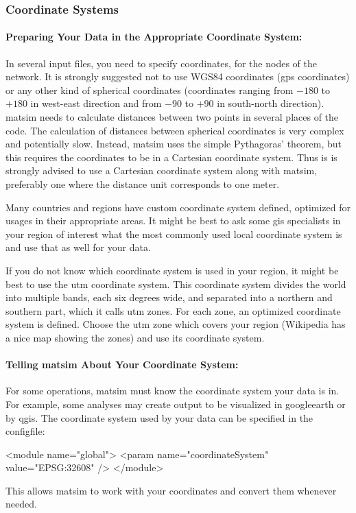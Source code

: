 \subsubsection{Coordinate Systems}
\label{sec:coordinatesystems}
\paragraph{Preparing Your Data in the Appropriate Coordinate System:}
In several input files, you need to specify coordinates, \eg for the nodes of the network. It is strongly suggested not to use WGS84 coordinates (\ie \gls{gps} coordinates) or any other kind of spherical coordinates (coordinates ranging from $-180$ to $+180$ in west-east direction and from $-90$ to $+90$ in south-north direction). \gls{matsim} needs to calculate distances between two points in several places of the code. The calculation of distances between spherical coordinates is very complex and potentially slow. Instead, \gls{matsim} uses the simple Pythagoras' theorem, but this requires the coordinates to be in a Cartesian coordinate system. Thus is is strongly advised to use a Cartesian coordinate system along with \gls{matsim}, preferably one where the distance unit corresponds to one meter.

Many countries and regions have custom coordinate system defined, optimized for usages in their appropriate areas. It might be best to ask some \gls{gis} specialists in your region of interest what the most commonly used local coordinate system is and use that as well for your data.

If you do not
know which coordinate system is used in your region, it might be best to use the \gls{utm} coordinate system. This coordinate system divides the world into multiple bands, each six degrees wide, and separated into a northern and southern part, which it calls \gls{utm} zones. For each zone, an optimized coordinate system is defined. Choose the \gls{utm} zone which covers your region (Wikipedia has a nice map showing the zones) and use its coordinate system. 

\paragraph{Telling \protect\gls{matsim} About Your Coordinate System:}

For some operations, \gls{matsim} must know the coordinate system your data is in. For example, some analyses may create output to be visualized in \gls{googleearth} or by \gls{qgis}.
The coordinate system used by your data can be specified in the \gls{configfile}:
\begin{xml}
<module name="global"> 
  <param name="coordinateSystem" value="EPSG:32608" /> 
</module>
\end{xml}
This allows \gls{matsim} to work with your coordinates and convert them whenever needed. 

